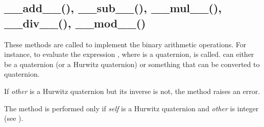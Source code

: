 \documentclass[letterpaper,10pt,english]{sphinxmanual}
\begin{document}
\subsection{\_\_add\_\_(), \_\_sub\_\_(), \_\_mul\_\_(), \_\_div\_\_(), \_\_mod\_\_()}
\label{methods:add-sub-mul-div-mod}

\begin{fulllineitems}
\label{methods:__add__}
\end{fulllineitems}


\begin{fulllineitems}
\label{methods:__sub__}
\end{fulllineitems}


\begin{fulllineitems}
\label{methods:__mul__}
\end{fulllineitems}


\begin{fulllineitems}
\label{methods:__div__}
\end{fulllineitems}


\begin{fulllineitems}
\label{methods:__mod__}
\end{fulllineitems}


These methods are called to implement the binary arithmetic operations. For instance, to evaluate the expression , where  is a quaternion,  is called.  can either be a quaternion (or a Hurwitz quaternion) or something that can be converted to quaternion.

If \emph{other} is a Hurwitz quaternion but its inverse is not, the  method raises an error.

The  method is performed only if \emph{self} is a Hurwitz quaternion and \emph{other} is integer (see ).
\end{document}
